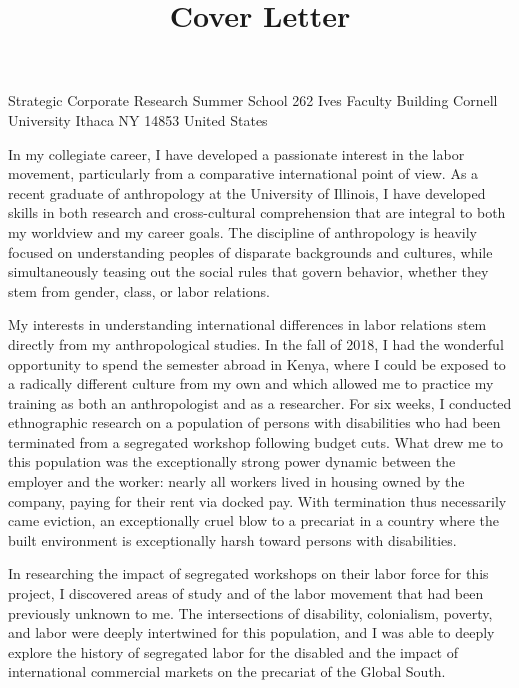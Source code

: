 \title{Cover Letter}
\maketitle

\begin{adjustwidth}{0.2in}{0.2in}

\toaddress
    {Strategic Corporate Research Summer School}
    {262 Ives Faculty Building}
    {Cornell University}
    {Ithaca}
    {NY}
    {14853}
    {United States}

\noindent
In my collegiate career, I have developed a passionate interest in the labor movement,
particularly from a comparative international point of view.
As a recent graduate of anthropology at the University of Illinois,
I have developed skills in both research and cross-cultural comprehension that are
integral to both my worldview and my career goals. The discipline of anthropology
is heavily focused on understanding peoples of disparate backgrounds and cultures,
while simultaneously teasing out the social rules that govern behavior, whether they
stem from gender, class, or labor relations.

My interests in understanding international differences in labor relations
stem directly from my anthropological studies.
In the fall of 2018, I had the wonderful opportunity to spend the semester abroad
in Kenya, where I could be exposed to a radically different culture from my own
and which allowed me to practice my training as both an anthropologist and as a researcher.
For six weeks, I conducted ethnographic research on a population of persons with
disabilities who had been terminated from a segregated workshop following budget cuts.
What drew me to this population was the exceptionally strong power dynamic between the
employer and the worker: nearly all workers lived in housing owned by the company,
paying for their rent via docked pay. With termination thus necessarily came eviction,
an exceptionally cruel blow to a precariat in a country where the built environment is
exceptionally harsh toward persons with disabilities.

In researching the impact of segregated workshops on their labor force for this project,
I discovered areas of study and of the labor movement that had been previously unknown to me.
The intersections of disability, colonialism, poverty, and labor were deeply intertwined
for this population, and I was able to deeply explore the history of segregated labor for
the disabled and the impact of international commercial markets on the precariat of the Global South.


\end{adjustwidth}
